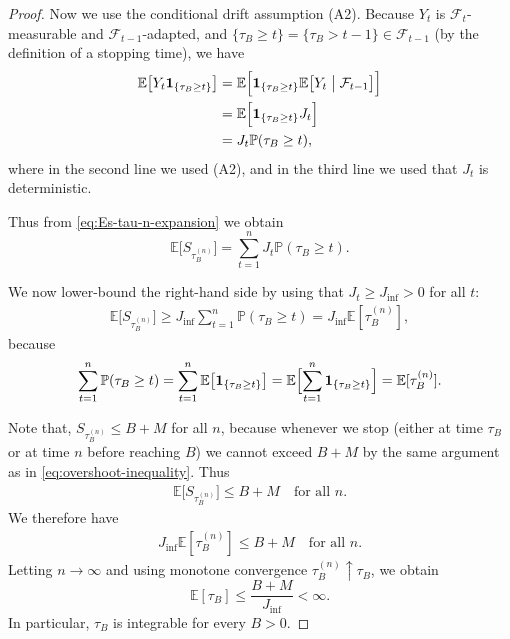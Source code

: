 \begin{proof}
Now we use the conditional drift assumption (A2). Because $Y_t$ is $\mathcal{F}_t$-measurable and $\mathcal{F}_{t-1}$-adapted, and $\{\tau_B\geq t\} = \{\tau_B>t-1\}\in\mathcal{F}_{t-1}$ (by the definition of a stopping time), we have
\begin{align*}
  \mathbb{E}\bigl[Y_t \mathbf{1}_{\{\tau_B\geq t\}}\bigr]
  &= \mathbb{E}\Bigl[
       \mathbf{1}_{\{\tau_B\geq t\}}
       \mathbb{E}\bigl[Y_t \bigm|\mathcal{F}_{t-1}\bigr]
     \Bigr] \\
  &= \mathbb{E}\Bigl[
       \mathbf{1}_{\{\tau_B\geq t\}}J_t
     \Bigr] \\
  &= J_t \mathbb{P}(\tau_B\geq t),
\end{align*}
where in the second line we used (A2), and in the third line we used that $J_t$ is deterministic.

Thus from \eqref{eq:Es-tau-n-expansion} we obtain
\begin{equation}
  \mathbb{E}\bigl[S_{\tau_B^{(n)}}\bigr]
  =
  \sum_{t=1}^n J_t\mathbb{P}(\tau_B\geq t).
  \label{eq:Es-tau-n-with-Jt}
\end{equation}

We now lower-bound the right-hand side by using that $J_t\geq J_{\inf}>0$ for all $t$:
\begin{align*}
  \mathbb{E}\bigl[S_{\tau_B^{(n)}}\bigr]
  \geq
  J_{\inf} \sum_{t=1}^n \mathbb{P}(\tau_B\geq t)
  = J_{\inf} \mathbb{E}[\tau_B^{(n)}],
\end{align*}
because
\begin{align*}
  \sum_{t=1}^n \mathbb{P}(\tau_B\geq t)
  = \sum_{t=1}^n \mathbb{E}\bigl[\mathbf{1}_{\{\tau_B\geq t\}}\bigr]
  = \mathbb{E}\Bigl[\sum_{t=1}^n \mathbf{1}_{\{\tau_B\geq t\}}\Bigr]
  = \mathbb{E}[\tau_B^{(n)}].
\end{align*}

Note that, $S_{\tau_B^{(n)}}\leq B+M$ for all $n$, because whenever we stop (either at time $\tau_B$ or at time $n$ before reaching $B$) we cannot exceed $B+M$ by the same argument as in \eqref{eq:overshoot-inequality}. Thus
\begin{align*}
  \mathbb{E}\bigl[S_{\tau_B^{(n)}}\bigr]\leq B+M
  \quad\text{for all }n.
\end{align*}
We therefore have
\begin{align*}
  J_{\inf}\mathbb{E}[\tau_B^{(n)}]
  \leq B+M \quad\text{for all } n.
\end{align*}
Letting $n\to\infty$ and using monotone convergence $\tau_B^{(n)}\uparrow \tau_B$, we obtain
\begin{equation}\label{eq:tau-upper-crude}
  \mathbb{E}[\tau_B] \leq \frac{B+M}{J_{\inf}} < \infty.
\end{equation}
In particular, $\tau_B$ is integrable for every $B>0$.


\end{proof}
